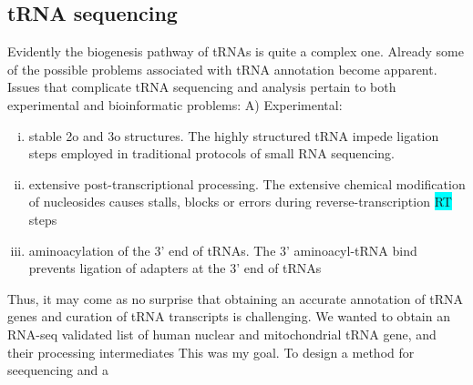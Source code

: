 \documentclass[12pt]{rockefeller}
\newcommand{\cyan}[1]{\colorbox{cyan}{#1}}
\begin{document}
\subsection{tRNA sequencing}
Evidently the biogenesis pathway of tRNAs is quite a complex one. 
Already some of the possible problems associated with tRNA annotation become apparent. 
Issues that complicate tRNA sequencing and analysis pertain to both experimental and bioinformatic problems:
A) Experimental:%
\vspace{-2.5mm}
\begin{enumerate}[i)]
\itemsep-0.5em 
\item stable 2o and 3o structures. The highly structured tRNA impede ligation steps employed in traditional protocols of small RNA sequencing.
\item extensive post-transcriptional processing. The extensive chemical modification of nucleosides causes stalls, blocks or errors during reverse-transcription \cyan{RT} steps
\item aminoacylation of the 3' end of tRNAs. The 3' aminoacyl-tRNA bind prevents ligation of adapters at the 3' end of tRNAs
\end{enumerate}
Thus, it may come as no surprise that obtaining an accurate annotation of tRNA genes and curation of tRNA transcripts is challenging. 
We wanted to obtain an RNA-seq validated list of human nuclear and mitochondrial tRNA gene, and their processing intermediates
This was my goal. To design a method for seequencing and a 
\end{document}
